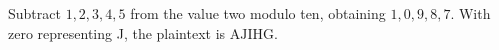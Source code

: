 Subtract $1,2,3,4,5$ from the value two modulo ten, obtaining $1,0,9,8,7$. With zero representing J, the plaintext is $\boxed{\text{AJIHG}}$.
